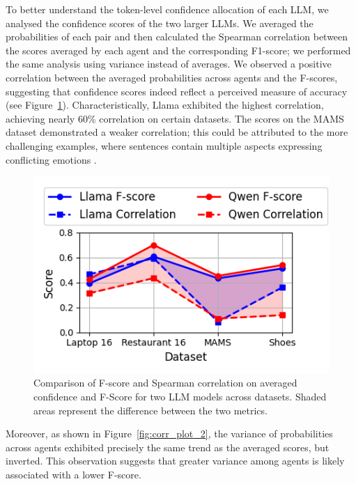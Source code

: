 \documentclass[11pt]{article}
\begin{document}
To better understand the token-level confidence allocation of each LLM, we analysed the confidence scores of the two larger LLMs. We averaged the probabilities of each pair and then calculated the Spearman correlation \citep{spearman1904} between the scores averaged by each agent and the corresponding F1-score; we performed the same analysis using variance instead of averages. We observed a positive correlation between the averaged probabilities across agents and the F-scores, suggesting that confidence scores indeed reflect a perceived measure of accuracy (see Figure~\ref{fig:corr_plot_1}). Characteristically, Llama exhibited the highest correlation, achieving nearly 60\% correlation on certain datasets. The scores on the MAMS dataset demonstrated a weaker correlation; this could be attributed to the more challenging examples, where sentences contain multiple aspects expressing conflicting emotions \citep{jiang-etal-2019-challenge}.

\begin{figure}[htbp]
\centering
\includegraphics[width=1\columnwidth]{figures/corr_1.png}
\caption{Comparison of F-score and Spearman correlation on averaged confidence and F-Score for two LLM models across datasets. Shaded areas represent the difference between the two metrics.}
\label{fig:corr_plot_1}
\end{figure}

Moreover, as shown in Figure~\ref{fig:corr_plot_2}, the variance of probabilities across agents exhibited precisely the same trend as the averaged scores, but inverted. This observation suggests that greater variance among agents is likely associated with a lower F-score.

\end{document}
